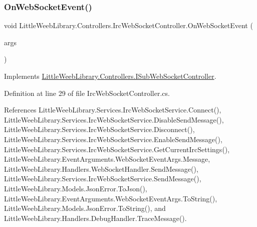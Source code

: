 \subsubsection{\texorpdfstring{On\+Web\+Socket\+Event()}{OnWebSocketEvent()}}
{\footnotesize\ttfamily void Little\+Weeb\+Library.\+Controllers.\+Irc\+Web\+Socket\+Controller.\+On\+Web\+Socket\+Event (\begin{DoxyParamCaption}\item[{\mbox{\hyperlink{class_little_weeb_library_1_1_event_arguments_1_1_web_socket_event_args}{Web\+Socket\+Event\+Args}}}]{args }\end{DoxyParamCaption})}



Implements \mbox{\hyperlink{interface_little_weeb_library_1_1_controllers_1_1_i_sub_web_socket_controller_adcb26b7b397d6a67ccbf114008c29985}{Little\+Weeb\+Library.\+Controllers.\+I\+Sub\+Web\+Socket\+Controller}}.



Definition at line 29 of file Irc\+Web\+Socket\+Controller.\+cs.



References Little\+Weeb\+Library.\+Services.\+Irc\+Web\+Socket\+Service.\+Connect(), Little\+Weeb\+Library.\+Services.\+Irc\+Web\+Socket\+Service.\+Disable\+Send\+Message(), Little\+Weeb\+Library.\+Services.\+Irc\+Web\+Socket\+Service.\+Disconnect(), Little\+Weeb\+Library.\+Services.\+Irc\+Web\+Socket\+Service.\+Enable\+Send\+Message(), Little\+Weeb\+Library.\+Services.\+Irc\+Web\+Socket\+Service.\+Get\+Current\+Irc\+Settings(), Little\+Weeb\+Library.\+Event\+Arguments.\+Web\+Socket\+Event\+Args.\+Message, Little\+Weeb\+Library.\+Handlers.\+Web\+Socket\+Handler.\+Send\+Message(), Little\+Weeb\+Library.\+Services.\+Irc\+Web\+Socket\+Service.\+Send\+Message(), Little\+Weeb\+Library.\+Models.\+Json\+Error.\+To\+Json(), Little\+Weeb\+Library.\+Event\+Arguments.\+Web\+Socket\+Event\+Args.\+To\+String(), Little\+Weeb\+Library.\+Models.\+Json\+Error.\+To\+String(), and Little\+Weeb\+Library.\+Handlers.\+Debug\+Handler.\+Trace\+Message().


